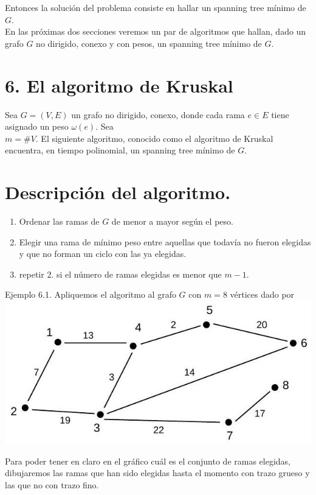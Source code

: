 \documentclass[10pt]{article}
\begin{document}
Entonces la solución del problema consiste en hallar un spanning tree mínimo de $G$.\\
En las próximas dos secciones veremos un par de algoritmos que hallan, dado un grafo $G$ no dirigido, conexo y con pesos, un spanning tree mínimo de $G$.

\section*{6. El algoritmo de Kruskal}
Sea $G=(V, E)$ un grafo no dirigido, conexo, donde cada rama $e \in E$ tiene asignado un peso $\omega(e)$. Sea\\
$m=\# V$. El siguiente algoritmo, conocido como el algoritmo de Kruskal encuentra, en tiempo polinomial, un spanning tree mínimo de $G$.

\section*{Descripción del algoritmo.}
\begin{enumerate}
  \item Ordenar las ramas de $G$ de menor a mayor según el peso.
  \item Elegir una rama de mínimo peso entre aquellas que todavía no fueron elegidas y que no forman un ciclo con las ya elegidas.
  \item repetir 2. si el número de ramas elegidas es menor que $m-1$.
\end{enumerate}

Ejemplo 6.1. Apliquemos el algoritmo al grafo $G$ con $m=8$ vértices dado por\\
\includegraphics[max width=\textwidth, center]{2025_09_05_93c7c1835f249f70c0eeg-15(1)}

Para poder tener en claro en el gráfico cuál es el conjunto de ramas elegidas, dibujaremos las ramas que han sido elegidas hasta el momento con trazo grueso y las que no con trazo fino.
\end{document}
